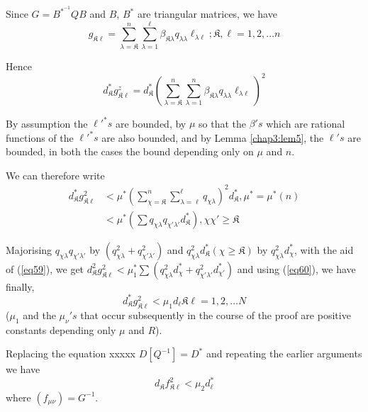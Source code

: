 Since $G =B^{*^{-1}} Q B $  and $B$, $B^*$  are triangular matrices, we
have  
$$
g_{\mathfrak{K} \ell} = \sum^n_{\lambda = \mathfrak{K} }
\sum^\ell_{\lambda = 1} \beta_{\mathfrak{K} \lambda} q_{\lambda
  \lambda} \ell_{\lambda \ell}; \mathfrak{K}, \ell = 1,2, \ldots n 
$$

 Hence
 $$
 d^*_\mathfrak{K} g^z_{\mathfrak{K} \ell} = d^*_{\mathfrak{K}} (
 \sum^n_{\lambda = \mathfrak{K}}  \sum^n_{\lambda = 1} \beta_{\mathfrak{K}
   \lambda} q_{\lambda \lambda} \ell_{\lambda \ell} )^2 
 $$

 By assumption the $\ell'^*s$ are bounded, by $\mu$  so
 that the $\beta's$ which are rational functions of the
 $ \ell'^*s$ are also bounded, and by Lemma \ref{chap3:lem5}, the $
 \ell's$ are bounded, in both the cases the bound
 depending only on $\mu$ and $n$. 
 
 We can therefore write
 \begin{align*} 
 d^*_\mathfrak{K} g^2_{\mathfrak{K} \ell}  & <  \mu^* ( \sum^n_{\chi
   = \mathfrak{K}} \sum^\ell_{\lambda = \ell} q_{\chi \lambda} )^2
 d^*_\mathfrak{K}, \mu^* = \mu^* (n)\\ 
 & <  \mu^* ( \sum  q_{\chi \lambda} q_{\chi' \lambda'} 
 d^*_\mathfrak{K} ) , \chi  \chi' \ge \mathfrak{K}  
\end{align*}

Majorising $q_{\chi \lambda} q_{\chi' \lambda'}$ by $( q^2_{\chi
  \lambda} + q^2_{\chi' \lambda'})$ and $ q^2_{\chi \lambda}
d^*_\mathfrak{K} ( \chi \ge \mathfrak{K} )$ by $ q^2_{\chi \lambda}
d^*_\chi$, with the aid of (\ref{eq59}), we get  $d^2_\mathfrak{K}
g^2_{\mathfrak{K} \ell} < \mu^*_1  \sum(q^2_{ \chi \lambda}
d^*_\chi  + q^2_{\chi' \lambda'} d^*_{\chi'})$ and using (\ref{eq60}), we have
finally, 
\begin{equation*} 
d^*_\mathfrak{K} g^2_{\mathfrak{K} \ell} < \mu_1 d_\ell    \mathfrak{K}
\ell = 1,2, \ldots N \tag{61}\label{eq61}   
\end{equation*}
($\mu_1$ and the  $\mu_\nu's$ that occur subsequently in the
course of the proof are positive constants depending only $\mu $ and
$R$). 

Replacing the  equation  xxxxx  $ D [ Q^{-1} ] = D^* $\pageoriginale
and repeating the earlier arguments we have   
\begin{equation*}
d_\mathfrak{K} f^2_{\mathfrak{K} \ell} < \mu_2 d^*_\ell \tag{62}\label{eq62}  
\end{equation*}
where  $ ( f_{\mu \nu} ) = G^{-1} $.


